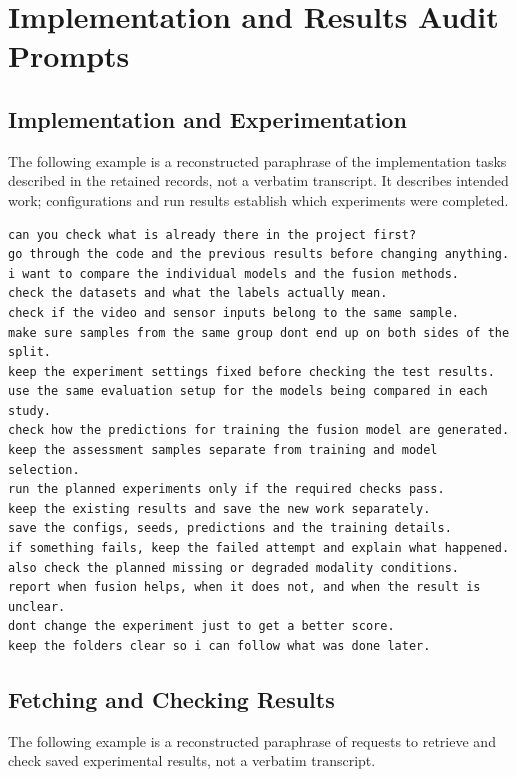 \chapter{Implementation and Results Audit Prompts}
\label{app:prompt-record}

\section{Implementation and Experimentation}
The following example is a reconstructed paraphrase of the implementation tasks
described in the retained records, not a verbatim transcript. It describes intended
work; configurations and run results establish which experiments were completed.

\begingroup\singlespacing\footnotesize
\begin{verbatim}
can you check what is already there in the project first?
go through the code and the previous results before changing anything.
i want to compare the individual models and the fusion methods.
check the datasets and what the labels actually mean.
check if the video and sensor inputs belong to the same sample.
make sure samples from the same group dont end up on both sides of the split.
keep the experiment settings fixed before checking the test results.
use the same evaluation setup for the models being compared in each study.
check how the predictions for training the fusion model are generated.
keep the assessment samples separate from training and model selection.
run the planned experiments only if the required checks pass.
keep the existing results and save the new work separately.
save the configs, seeds, predictions and the training details.
if something fails, keep the failed attempt and explain what happened.
also check the planned missing or degraded modality conditions.
report when fusion helps, when it does not, and when the result is unclear.
dont change the experiment just to get a better score.
keep the folders clear so i can follow what was done later.
\end{verbatim}
\endgroup

\section{Fetching and Checking Results}
The following example is a reconstructed paraphrase of requests to retrieve and check
saved experimental results, not a verbatim transcript.

